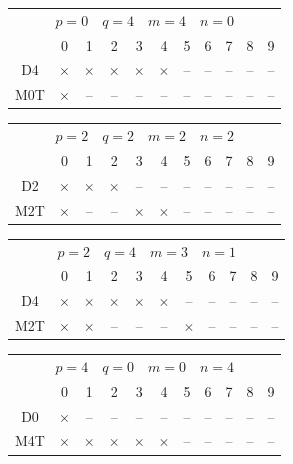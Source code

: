 \documentclass[11pt]{article}
\begin{document}
\begin{table}[ht!]
\centering
\addtolength{\tabcolsep}{-2pt}    
\small
\begin{tabular}{ccccccccccc}
\multicolumn{11}{c}{\quad\quad\quad$\boxed{p=0 \quad q=4 \quad m=4 \quad n=0}$}\\[4pt]
& 0 & 1 & 2 & 3 & 4 & 5 & 6 & 7 & 8 & 9 \\
D4& $\times$ & $\times$ & $\times$ & $\times$ & $\times$ & -- & -- & -- & -- & -- \\
M$0$T& $\times$ & -- & -- & -- & -- & -- & -- & -- & -- & -- \\
\end{tabular}\hspace{2em}
\begin{tabular}{ccccccccccc}
\multicolumn{11}{c}{\quad\quad\quad$\boxed{p=2 \quad q=2 \quad m=2 \quad n = 2}$}\\[4pt]
& 0 & 1 & 2 & 3 & 4 & 5 & 6 & 7 & 8 & 9 \\
D2& $\times$ & $\times$ & $\times$ & -- & -- & -- & -- & -- & -- & -- \\
M$2$T& $\times$ & -- & -- & $\times$ & $\times$ & -- & -- & -- & -- & -- \\[4pt]
\end{tabular}

\vspace{1em}
\begin{tabular}{ccccccccccc}
\multicolumn{11}{c}{\quad\quad\quad$\boxed{p=2 \quad q=4\quad m=3 \quad n=1}$}\\[4pt]
& 0 & 1 & 2 & 3 & 4 & 5 & 6 & 7 & 8 & 9 \\
D4 & $\times$ & $\times$ & $\times$ & $\times$ & $\times$ & -- & -- & -- & -- & -- \\
M2T & $\times$ & $\times$ & -- & -- & -- & $\times$ & -- & -- & -- & -- \\
\end{tabular}\hspace{2em}
\begin{tabular}{ccccccccccc}
\multicolumn{11}{c}{\quad\quad\quad$\boxed{p=4 \quad q=0 \quad m=0 \quad n=4}$}\\[2pt]
& 0 & 1 & 2 & 3 & 4 & 5 & 6 & 7 & 8 & 9 \\
D0 & $\times$ & -- & -- & -- & -- & -- & -- & -- & -- & -- \\
M4T & $\times$ & $\times$ & $\times$ & $\times$ & $\times$ & -- & -- & -- & -- & -- \\
\end{tabular}


\end{table}
\end{document}
